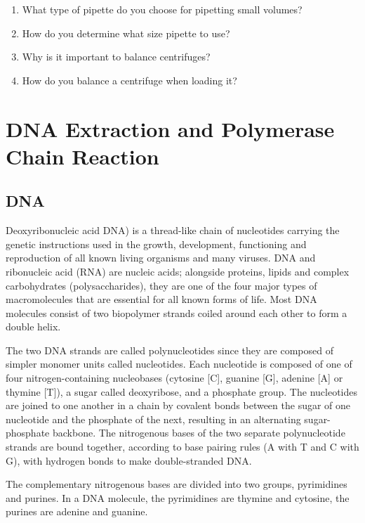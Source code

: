 \documentclass[]{book}
\providecommand{\tightlist}{%
  \setlength{\itemsep}{0pt}\setlength{\parskip}{0pt}}
\begin{document}
\begin{enumerate}
\def\labelenumi{\arabic{enumi}.}
\tightlist
\item
  What type of pipette do you choose for pipetting small volumes?
\item
  How do you determine what size pipette to use?
\item
  Why is it important to balance centrifuges?
\item
  How do you balance a centrifuge when loading it?
\end{enumerate}

\hypertarget{dna-extraction-and-polymerase-chain-reaction}{%
\chapter{DNA Extraction and Polymerase Chain Reaction}\label{dna-extraction-and-polymerase-chain-reaction}}

\hypertarget{dna}{%
\section{DNA}\label{dna}}

Deoxyribonucleic acid DNA) is a thread-like chain of nucleotides carrying the genetic instructions used in the growth, development, functioning and reproduction of all known living organisms and many viruses. DNA and ribonucleic acid (RNA) are nucleic acids; alongside proteins, lipids and complex carbohydrates (polysaccharides), they are one of the four major types of macromolecules that are essential for all known forms of life. Most DNA molecules consist of two biopolymer strands coiled around each other to form a double helix.

The two DNA strands are called polynucleotides since they are composed of simpler monomer units called nucleotides. Each nucleotide is composed of one of four nitrogen-containing nucleobases (cytosine {[}C{]}, guanine {[}G{]}, adenine {[}A{]} or thymine {[}T{]}), a sugar called deoxyribose, and a phosphate group. The nucleotides are joined to one another in a chain by covalent bonds between the sugar of one nucleotide and the phosphate of the next, resulting in an alternating sugar-phosphate backbone. The nitrogenous bases of the two separate polynucleotide strands are bound together, according to base pairing rules (A with T and C with G), with hydrogen bonds to make double-stranded DNA.

The complementary nitrogenous bases are divided into two groups, pyrimidines and purines. In a DNA molecule, the pyrimidines are thymine and cytosine, the purines are adenine and guanine.
\end{document}
